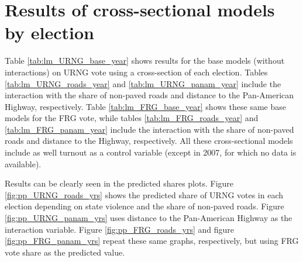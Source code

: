\documentclass[a4paper, 12pt, notitlepage]{article}
\begin{document}
\clearpage
\section{Results of cross-sectional models by election}\label{app:results_year}

Table \ref{tab:lm_URNG_base_year} shows results for the base models (without interactions) on URNG vote using a cross-section of each election.
Tables \ref{tab:lm_URNG_roads_year} and \ref{tab:lm_URNG_panam_year} include the interaction with the share of non-paved roads and distance to the Pan-American Highway, respectively.
Table \ref{tab:lm_FRG_base_year} shows these same base models for the FRG vote, while tables \ref{tab:lm_FRG_roads_year} and \ref{tab:lm_FRG_panam_year} include the interaction with the share of non-paved roads and distance to the Highway, respectively.
All these cross-sectional models include as well turnout as a control variable (except in 2007, for which no data is available).

Results can be clearly seen in the predicted shares plots.
Figure \ref{fig:pp_URNG_roads_yrs} shows the predicted share of URNG votes in each election depending on state violence and the share of non-paved roads.
Figure \ref{fig:pp_URNG_panam_yrs} uses distance to the Pan-American Highway as the interaction variable.
Figure \ref{fig:pp_FRG_roads_yrs} and figure \ref{fig:pp_FRG_panam_yrs} repeat these same graphs, respectively, but using FRG vote share as the predicted value.








\end{document}
